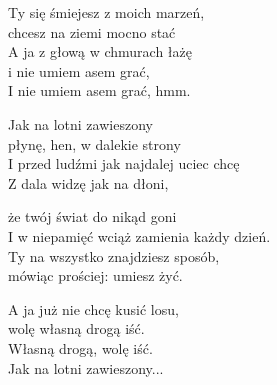 \begin{text}
    Ty się śmiejesz z moich marzeń,\\
    chcesz na ziemi mocno stać\\
    A ja z głową w chmurach łażę\\
    i nie umiem asem grać,\\
    I nie umiem asem grać, hmm.

    Jak na lotni zawieszony\\
    płynę, hen, w dalekie strony\\
    I przed ludźmi jak najdalej uciec chcę\\
    Z dala widzę jak na dłoni,

    że twój świat do nikąd goni\\
    I w niepamięć wciąż zamienia każdy dzień.\\
    Ty na wszystko znajdziesz sposób,\\
    mówiąc prościej: umiesz żyć.

    A ja już nie chcę kusić losu,\\
    wolę własną drogą iść.\\
    Własną drogą, wolę iść.\\
    Jak na lotni zawieszony...
\end{text}
